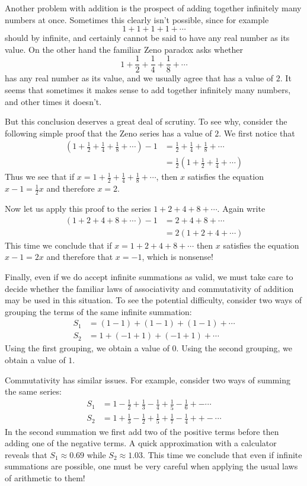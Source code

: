\documentclass[11pt,oneside]{amsbook}
\theoremstyle{definition}
\theoremstyle{plain}
\theoremstyle{definition}
\theoremstyle{remark}
\numberwithin{equation}{section}
\numberwithin{figure}{section}
\begin{document}
Another problem with addition is the prospect of adding together infinitely many numbers at once. Sometimes this clearly isn't possible, since for example 
\[1+1+1+1+\cdots
\]
should by infinite, and certainly cannot be said to have any real number as its value. On the other hand the familiar Zeno paradox asks whether
\[1+\frac12+\frac14+\frac18+\cdots
\]
has any real number as its value, and we usually agree that has a value of $2$. It seems that sometimes it makes sense to add together infinitely many numbers, and other times it doesn't.

But this conclusion deserves a great deal of scrutiny. To see why, consider the following simple proof that the Zeno series has a value of $2$. We first notice that
\begin{align*}
(1+\frac12+\frac14+\frac18+\cdots)-1&=\frac12+\frac14+\frac18+\cdots\\
                                    &=\frac12(1+\frac12+\frac14+\cdots)
\end{align*}
Thus we see that if $x=1+\frac12+\frac14+\frac18+\cdots$, then $x$ satisfies the equation $x-1=\frac12x$ and therefore $x=2$.

Now let us apply this proof to the series $1+2+4+8+\cdots$. Again write
\begin{align*}
(1+2+4+8+\cdots)-1&=2+4+8+\cdots\\
                  &=2(1+2+4+\cdots)
\end{align*}
This time we conclude that if $x=1+2+4+8+\cdots$ then $x$ satisfies the equation $x-1=2x$ and therefore that $x=-1$, which is nonsense!

Finally, even if we do accept infinite summations as valid, we must take care to decide whether the familiar laws of associativity and commutativity of addition may be used in this situation. To see the potential difficulty, consider two ways of grouping the terms of the same infinite summation:
\begin{align*}
S_1&=(1-1)+(1-1)+(1-1)+\cdots\\
S_2&=1+(-1+1)+(-1+1)+\cdots
\end{align*}
Using the first grouping, we obtain a value of $0$. Using the second grouping, we obtain a value of $1$.

Commutativity has similar issues. For example, consider two ways of summing the same series:
\begin{align*}
S_1&=1-\frac12+\frac13-\frac14+\frac15-\frac16+-\cdots\\
S_2&=1+\frac13-\frac12+\frac15+\frac17-\frac14++-\cdots
\end{align*}
In the second summation we first add two of the positive terms before then adding one of the negative terms. A quick approximation with a calculator reveals that $S_1\approx0.69$ while $S_2\approx1.03$. This time we conclude that even if infinite summations are possible, one must be very careful when applying the usual laws of arithmetic to them!
\end{document}
